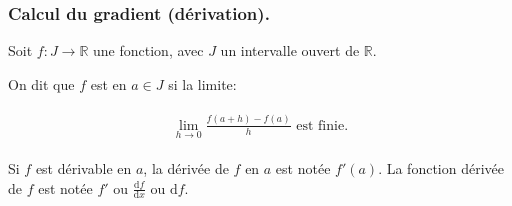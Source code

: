 \documentclass[letterpaper,11pt,english]{sphinxmanual}
\begin{document}
\subsubsection{Calcul du gradient (dérivation).}
\label{\detokenize{chapter2:calcul-du-gradient-derivation}}
\begin{DUlineblock}{0em}
\item[] 
\item[] 
\item[] Soit \(f: J\rightarrow \mathbb{R}\) une fonction, avec \(J\)
un intervalle ouvert de \(\mathbb{R}\).
\item[] On dit que \(f\) est  en \(a\in J\) si la limite:
\end{DUlineblock}
\begin{equation}\label{equation:chapter2:chapter2:26}
\begin{split}\begin{aligned}
    \lim_{h\rightarrow 0} \frac{f(a+h)-f(a)}{h} \text{ est finie.}
\end{aligned}\end{split}
\end{equation}
\begin{DUlineblock}{0em}
\item[] Si \(f\) est dérivable en \(a\), la dérivée de \(f\) en
\(a\) est notée \(f'(a).\) La fonction dérivée de \(f\)
est notée \(f'\) ou \(\frac{\mathrm{d}f}{\mathrm{d}x}\) ou
\(\mathrm{d}f\).
\item[] 
\end{DUlineblock}
\end{document}
